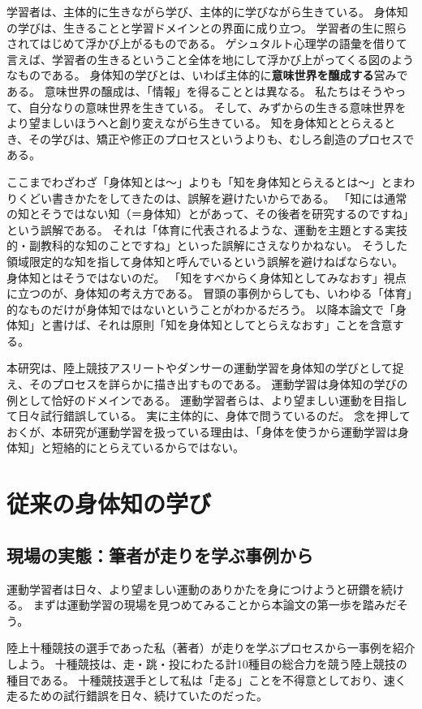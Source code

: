 学習者は、主体的に生きながら学び、主体的に学びながら生きている。
身体知の学びは、生きることと学習ドメインとの界面に成り立つ。
学習者の生に照らされてはじめて浮かび上がるものである。
ゲシュタルト心理学の語彙を借りて言えば、学習者の生きるということ全体を地にして浮かび上がってくる図のようなものである。
身体知の学びとは、いわば主体的に\textbf{意味世界を醸成する}営みである。
意味世界の醸成は、「情報」を得ることとは異なる。
私たちはそうやって、自分なりの意味世界を生きている。
そして、みずからの生きる意味世界をより望ましいほうへと創り変えながら生きている。
知を身体知ととらえるとき、その学びは、矯正や修正のプロセスというよりも、むしろ創造のプロセスである。

ここまでわざわざ「身体知とは〜」よりも「知を身体知とらえるとは〜」とまわりくどい書きかたをしてきたのは、誤解を避けたいからである。
「知には通常の知とそうではない知（＝身体知）とがあって、その後者を研究するのですね」という誤解である。
それは「体育に代表されるような、運動を主題とする実技的・副教科的な知のことですね」といった誤解にさえなりかねない。
そうした領域限定的な知を指して身体知と呼んでいるという誤解を避けねばならない。
身体知とはそうではないのだ。
「知をすべからく身体知としてみなおす」視点に立つのが、身体知の考え方である。
冒頭の事例からしても、いわゆる「体育」的なものだけが身体知ではないということがわかるだろう。
以降本論文で「身体知」と書けば、それは原則「知を身体知としてとらえなおす」ことを含意する。

本研究は、陸上競技アスリートやダンサーの運動学習を身体知の学びとして捉え、そのプロセスを詳らかに描き出すものである。
運動学習は身体知の学びの例として恰好のドメインである。
運動学習者らは、より望ましい運動を目指して日々試行錯誤している。
実に主体的に、身体で問うているのだ。
念を押しておくが、本研究が運動学習を扱っている理由は、「身体を使うから運動学習は身体知」と短絡的にとらえているからではない。
\section{従来の身体知の学び}
\label{sec:myexample}
\subsection{現場の実態：筆者が走りを学ぶ事例から}
運動学習者は日々、より望ましい運動のありかたを身につけようと研鑽を続ける。
まずは運動学習の現場を見つめてみることから本論文の第一歩を踏みだそう。

陸上十種競技の選手であった私（著者）が走りを学ぶプロセス\cite{horiuchi:2016a}から一事例を紹介しよう。
十種競技は、走・跳・投にわたる計10種目の総合力を競う陸上競技の種目である。
十種競技選手として私は「走る」ことを不得意としており、速く走るための試行錯誤を日々、続けていたのだった。

